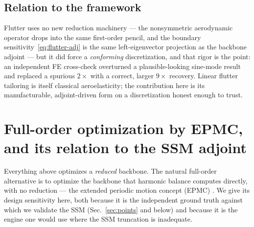 \documentclass[11pt]{article}
\begin{document}
\subsection{Relation to the framework}
Flutter uses no new reduction machinery --- the nonsymmetric aerodynamic operator drops into the same
first-order pencil, and the boundary sensitivity~\eqref{eq:flutter-adj} is the same left-eigenvector
projection as the backbone adjoint --- but it did force a \emph{conforming} discretization, and that
rigor is the point: an independent FE cross-check overturned a plausible-looking sine-mode result and
replaced a spurious $2\times$ with a correct, larger $9\times$ recovery. Linear flutter tailoring is
itself classical aeroelasticity; the contribution here is its manufacturable, adjoint-driven form on a
discretization honest enough to trust.

\section{Full-order optimization by EPMC, and its relation to the SSM adjoint}
\label{sec:epmc}

Everything above optimizes a \emph{reduced} backbone. The natural full-order
alternative is to optimize the backbone that harmonic balance computes directly,
with no reduction --- the extended periodic motion concept (EPMC)
\cite{krack2015}. We give its design sensitivity here, both because it is the
independent ground truth against which we validate the SSM (Sec.~\ref{sec:points}
and below) and because it is the engine one would use where the SSM truncation is
inadequate.
\end{document}
